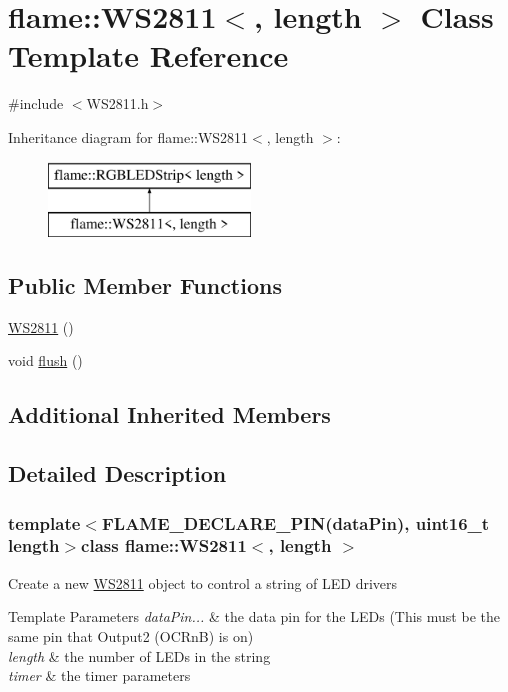 \hypertarget{classflame_1_1_w_s2811}{\section{flame\-:\-:W\-S2811$<$, length $>$ Class Template Reference}
\label{classflame_1_1_w_s2811}
}


{\ttfamily \#include $<$W\-S2811.\-h$>$}

Inheritance diagram for flame\-:\-:W\-S2811$<$, length $>$\-:\begin{figure}[H]
\begin{center}
\leavevmode
\includegraphics[height=2.000000cm]{classflame_1_1_w_s2811}
\end{center}
\end{figure}
\subsection*{Public Member Functions}
\begin{DoxyCompactItemize}
\item 
\hyperlink{classflame_1_1_w_s2811_a84e91f9e9b7f8187a168a80a58e0a9de}{W\-S2811} ()
\item 
void \hyperlink{classflame_1_1_w_s2811_a53ce9fb8cba4af3bd34b8371a7b3851a}{flush} ()
\end{DoxyCompactItemize}
\subsection*{Additional Inherited Members}


\subsection{Detailed Description}
\subsubsection*{template$<$F\-L\-A\-M\-E\-\_\-\-D\-E\-C\-L\-A\-R\-E\-\_\-\-P\-I\-N(data\-Pin), uint16\-\_\-t length$>$class flame\-::\-W\-S2811$<$, length $>$}

Create a new \hyperlink{classflame_1_1_w_s2811}{W\-S2811} object to control a string of L\-E\-D drivers 
\begin{DoxyTemplParams}{Template Parameters}
{\em data\-Pin...} & the data pin for the L\-E\-Ds (This must be the same pin that Output2 (O\-C\-Rn\-B) is on) \\
\hline
{\em length} & the number of L\-E\-Ds in the string \\
\hline
{\em timer} & the timer parameters \\
\hline
\end{DoxyTemplParams}


